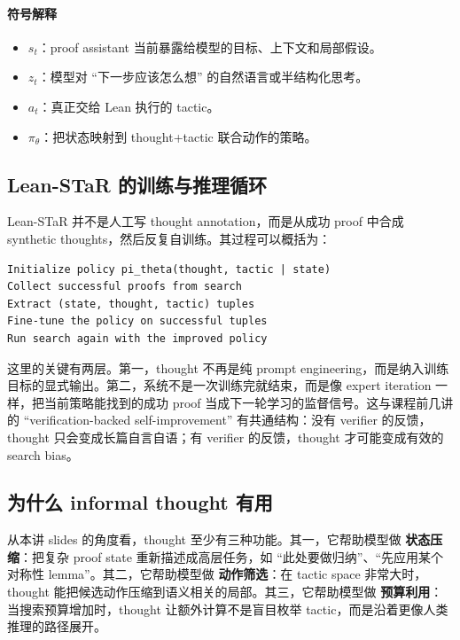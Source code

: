 \documentclass[a4paper]{article}
\begin{document}
\paragraph{符号解释}
\begin{itemize}
\item $s_t$：proof assistant 当前暴露给模型的目标、上下文和局部假设。
\item $z_t$：模型对 ``下一步应该怎么想'' 的自然语言或半结构化思考。
\item $a_t$：真正交给 Lean 执行的 tactic。
\item $\pi_{\theta}$：把状态映射到 thought+tactic 联合动作的策略。
\end{itemize}

\subsection{Lean-STaR 的训练与推理循环}

Lean-STaR 并不是人工写 thought annotation，而是从成功 proof 中合成 synthetic thoughts，然后反复自训练。其过程可以概括为：

\begin{lstlisting}
Initialize policy pi_theta(thought, tactic | state)
Collect successful proofs from search
Extract (state, thought, tactic) tuples
Fine-tune the policy on successful tuples
Run search again with the improved policy
\end{lstlisting}

这里的关键有两层。第一，thought 不再是纯 prompt engineering，而是纳入训练目标的显式输出。第二，系统不是一次训练完就结束，而是像 expert iteration 一样，把当前策略能找到的成功 proof 当成下一轮学习的监督信号。这与课程前几讲的 ``verification-backed self-improvement'' 有共通结构：没有 verifier 的反馈，thought 只会变成长篇自言自语；有 verifier 的反馈，thought 才可能变成有效的 search bias。

\subsection{为什么 informal thought 有用}

从本讲 slides 的角度看，thought 至少有三种功能。其一，它帮助模型做 \textbf{状态压缩}：把复杂 proof state 重新描述成高层任务，如 ``此处要做归纳''、``先应用某个对称性 lemma''。其二，它帮助模型做 \textbf{动作筛选}：在 tactic space 非常大时，thought 能把候选动作压缩到语义相关的局部。其三，它帮助模型做 \textbf{预算利用}：当搜索预算增加时，thought 让额外计算不是盲目枚举 tactic，而是沿着更像人类推理的路径展开。
\end{document}
